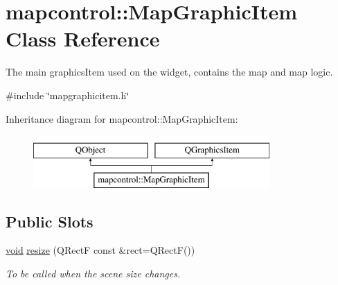 \hypertarget{classmapcontrol_1_1_map_graphic_item}{\section{mapcontrol\-:\-:Map\-Graphic\-Item Class Reference}
\label{classmapcontrol_1_1_map_graphic_item}
}


The main graphics\-Item used on the widget, contains the map and map logic.  




{\ttfamily \#include \char`\"{}mapgraphicitem.\-h\char`\"{}}

Inheritance diagram for mapcontrol\-:\-:Map\-Graphic\-Item\-:\begin{figure}[H]
\begin{center}
\leavevmode
\includegraphics[height=2.000000cm]{classmapcontrol_1_1_map_graphic_item}
\end{center}
\end{figure}
\subsection*{Public Slots}
\begin{DoxyCompactItemize}
\item 
\hyperlink{group___u_a_v_objects_plugin_ga444cf2ff3f0ecbe028adce838d373f5c}{void} \hyperlink{group___o_p_map_widget_ga717dc7dc9953d7242b9f0db9d2e3951e}{resize} (Q\-Rect\-F const \&rect=Q\-Rect\-F())
\begin{DoxyCompactList}\small\item\em To be called when the scene size changes. \end{DoxyCompactList}\end{DoxyCompactItemize}
